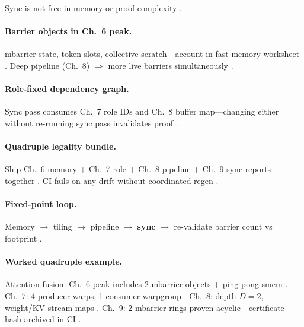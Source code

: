 Sync is not free in memory or proof complexity \citep{yirage2026,dao2022flashattention,shah2024flashattention3,chen2020compilerbasedhardw}.

\paragraph{Barrier objects in Ch.~6 peak.}
mbarrier state, token slots, collective scratch---account in fast-memory worksheet \citep{memoryfloor2026,nvidia2022hopper,amd2024xdna}.
Deep pipeline (Ch.~8) $\Rightarrow$ more live barriers simultaneously \citep{semianalysis2024tma,yirage2026}.

\paragraph{Role-fixed dependency graph.}
Sync pass consumes Ch.~7 role IDs and Ch.~8 buffer map---changing either without re-running sync pass invalidates proof \citep{shah2024flashattention3,yirage2026,wu2024mirage,mpk2025}.

\paragraph{Quadruple legality bundle.}
Ship Ch.~6 memory + Ch.~7 role + Ch.~8 pipeline + Ch.~9 sync reports together \citep{chen2020compilerbasedhardw,taxbreak2026,patel2025llminference}.
CI fails on any drift without coordinated regen \citep{yirage2026,mpk2025}.

\paragraph{Fixed-point loop.}
Memory $\rightarrow$ tiling $\rightarrow$ pipeline $\rightarrow$ \textbf{sync} $\rightarrow$ re-validate barrier count vs footprint \citep{yirage2026,wu2024mirage,dao2022flashattention,shah2024flashattention3}.

\paragraph{Worked quadruple example.}
Attention fusion: Ch.~6 peak includes $2$ mbarrier objects + ping-pong smem \citep{yirage2026,dao2022flashattention,semianalysis2024tma}.
Ch.~7: 4 producer warps, 1 consumer warpgroup \citep{shah2024flashattention3,mpk2025}.
Ch.~8: depth $D{=}2$, weight/KV stream maps \citep{kwon2023vllm,semianalysis2024tma}.
Ch.~9: 2 mbarrier rings proven acyclic---certificate hash archived in CI \citep{yirage2026,wu2024mirage,chen2020compilerbasedhardw,taxbreak2026}.

